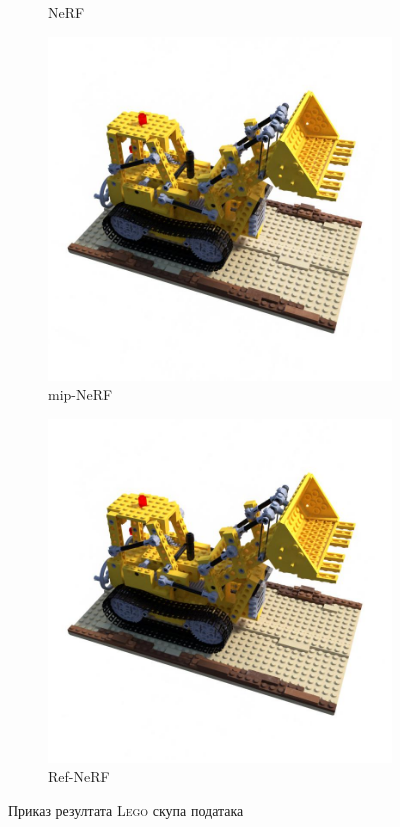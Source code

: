 \documentclass[12pt, a4paper, twoside]{book}
\numberwithin{equation}{chapter}
\numberwithin{theorem}{section}
\numberwithin{definition}{section}
\numberwithin{definitionChapter}{chapter}
\begin{document}
\begin{figure}[H]
\begin{subfigure}{0.475\textwidth}
			\caption{NeRF}
		\end{subfigure}
		\begin{subfigure}{0.475\textwidth}
			\centering
			\includegraphics[scale=0.25]{img/mipnerf/mipnerf_lego_31.jpg}
			\caption{mip-NeRF}
		\end{subfigure}
		\begin{subfigure}{0.475\textwidth}
			\centering
			\includegraphics[scale=0.25]{img/refnerf/refnerf_lego_31.jpg}
			\caption{Ref-NeRF}
		\end{subfigure}
		\caption{Приказ резултата \textsc{Lego} скупа података}
		\label{fig-lego-results}
	\end{figure}
\end{document}
